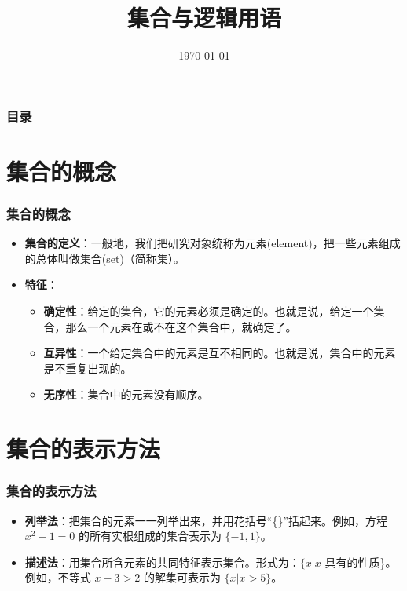 \documentclass[aspectratio=169]{ctexbeamer} %
\date{\today}
\title{集合与逻辑用语}
\begin{document}
\begin{frame}
\titlepage
\end{frame}

\begin{frame}
\frametitle{目录}
\tableofcontents
\end{frame}

\section{集合的概念}

\begin{frame}
\frametitle{集合的概念}
\begin{itemize}
\item \textbf{集合的定义}：一般地，我们把研究对象统称为\alert{元素}(element)，把一些元素组成的总体叫做\alert{集合}(set)（简称集）。
\item \textbf{特征}：
  \begin{itemize}
  \item \textbf{确定性}：给定的集合，它的元素必须是确定的。也就是说，给定一个集合，那么一个元素在或不在这个集合中，就确定了。
  \item \textbf{互异性}：一个给定集合中的元素是互不相同的。也就是说，集合中的元素是不重复出现的。
  \item \textbf{无序性}：集合中的元素没有顺序。
  \end{itemize}
\end{itemize}
\end{frame}

\section{集合的表示方法}

\begin{frame}
\frametitle{集合的表示方法}
\begin{itemize}
\item \textbf{列举法}：把集合的元素一一列举出来，并用花括号“\{\}”括起来。例如，方程 \(x^2 - 1 = 0\) 的所有实根组成的集合表示为 \(\{-1, 1\}\)。\\
\item \textbf{描述法}：用集合所含元素的共同特征表示集合。形式为：\(\{x | x\) 具有的性质\}。例如，不等式 \(x - 3 > 2\) 的解集可表示为 \(\{x | x > 5\}\)。
\end{itemize}
\end{frame}
\end{document}
